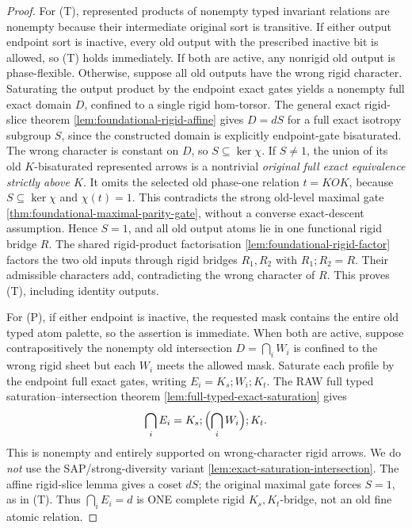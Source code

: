 \begin{proof}
For (T), represented products of nonempty
typed invariant relations are nonempty
because their intermediate original sort
is transitive. If either output endpoint
sort is inactive, every old output with
the prescribed inactive bit is allowed,
so (T) holds immediately. If both are
active, any nonrigid old output is
phase-flexible. Otherwise, suppose all
old outputs have the wrong rigid character.
Saturating the output product by the
endpoint exact gates yields a nonempty
full exact domain \(D\), confined to a
single rigid hom-torsor. The general exact rigid-slice theorem
\cref{lem:foundational-rigid-affine} gives
\(D=dS\) for a full exact isotropy subgroup \(S\),
since the constructed domain is explicitly
endpoint-gate bisaturated.
The wrong character is constant on \(D\),
so \(S\subseteq\ker\chi\).
If \(S\ne1\), the union of its old
$K$-bisaturated represented arrows is
a nontrivial \emph{original full exact
equivalence strictly above $K$}. It
omits the selected old phase-one relation
$t=KOK$, because $S\subseteq\ker\chi$
and $\chi(t)=1$. This contradicts the
strong old-level maximal gate
\cref{thm:foundational-maximal-parity-gate},
without a converse exact-descent assumption. Hence \(S=1\),
and all old output atoms lie in one
functional rigid bridge \(R\).
The shared rigid-product factorisation
\cref{lem:foundational-rigid-factor}
factors the two old inputs through
rigid bridges \(R_1,R_2\) with
\(R_1;R_2=R\).
Their admissible characters add,
contradicting the wrong character of
\(R\). This proves (T), including
identity outputs.

For (P), if either endpoint is inactive,
the requested mask contains the entire
old typed atom palette, so the assertion
is immediate. When both are active,
suppose contrapositively the
nonempty old intersection \(D=\bigcap_iW_i\)
is confined to the wrong rigid sheet
but each \(W_i\) meets the allowed mask.
Saturate each profile by the endpoint full exact gates,
writing \(E_i=K_s;W_i;K_t\). The RAW full typed
saturation--intersection theorem
\cref{lem:full-typed-exact-saturation} gives
\[
 \bigcap_i E_i=K_s;\Bigl(\bigcap_iW_i\Bigr);K_t.
\]
This is nonempty and entirely supported on wrong-character
rigid arrows. We do \emph{not} use the SAP/strong-diversity
variant \cref{lem:exact-saturation-intersection}.
The affine rigid-slice lemma gives a coset \(dS\);
the original maximal gate forces \(S=1\), as in (T).
Thus \(\bigcap_iE_i=d\) is ONE complete rigid
\(K_s,K_t\)-bridge, not an old fine atomic relation.


\end{proof}
